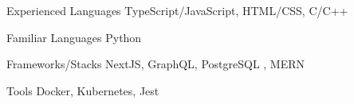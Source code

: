 

\begin{cvskills}

  \cvskill
  {Experienced Languages} %
  {TypeScript/JavaScript, HTML/CSS, C/C++} %

  \cvskill
  {Familiar Languages} %
  {Python} %

  \cvskill
  {Frameworks/Stacks} %
  { NextJS, GraphQL, PostgreSQL , MERN} %

  \cvskill
  {Tools} %
  { Docker, Kubernetes, Jest} %

\end{cvskills}